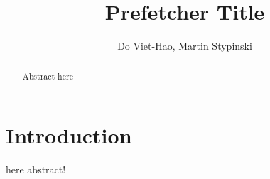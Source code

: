 \documentclass[journal,a4paper]{template/IEEEtran}
\begin{document}
\title{Prefetcher Title}
\author{Do Viet-Hao, Martin Stypinski}
\maketitle

\begin{abstract}
Abstract here
\end{abstract}

\section{Introduction}
 here abstract!
\end{document}
